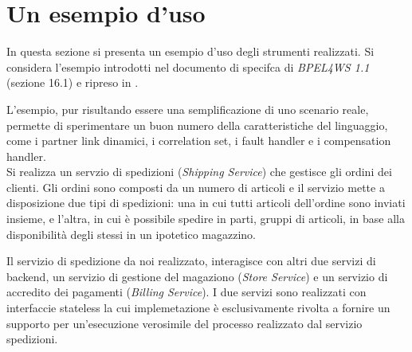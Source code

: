 
\section{Un esempio d'uso}

In questa sezione si presenta un esempio d'uso degli strumenti
realizzati. Si considera l'esempio introdotti nel documento di specifca di
\emph{BPEL4WS 1.1} \cite{BPEL11Spec} (sezione 16.1) e ripreso in
\cite{LaPuTie1}.

L'esempio, pur risultando essere una semplificazione di uno scenario reale,
permette di sperimentare un buon numero della caratteristiche del linguaggio,	
come i partner link dinamici, i correlation set, i fault handler e i
compensation handler.
\\

Si realizza un servzio di spedizioni (\emph{Shipping Service}) che gestisce
gli ordini dei clienti. Gli ordini sono composti da un numero di
articoli e il servizio mette a disposizione due tipi di spedizioni: una in cui
tutti articoli dell'ordine sono inviati insieme, e l'altra, in cui è possibile
spedire in parti, gruppi di articoli, in base alla disponibilità degli stessi in
un ipotetico magazzino.

Il servizio di spedizione da noi realizzato, interagisce con altri due servizi
di backend, un servizio di gestione del magaziono (\emph{Store Service}) e un
servizio di accredito dei pagamenti (\emph{Billing Service}). I due servizi
sono realizzati con interfaccie stateless la cui implemetazione è
esclusivamente rivolta a fornire un supporto per un'esecuzione verosimile del
processo realizzato dal servizio spedizioni.


